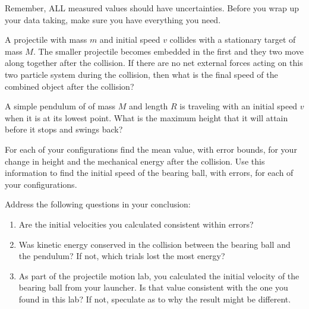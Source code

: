 \selfcheck

Remember, ALL measured values should have uncertainties. Before you wrap up your data taking, make sure you have everything you need.

\prelab

\prelabquestion
A projectile with mass $m$ and initial speed $v$ collides with a stationary target of mass $M$. The smaller projectile becomes embedded in the first and they two move along together after the collision. If there are no net external forces acting on this two particle system during the collision, then what is the final speed of the combined object after the collision?

\prelabquestion
A simple pendulum of of mass $M$ and length $R$ is traveling with an initial speed $v$ when it is at its lowest point.  What is the maximum height that it will attain before it stops and swings back?

\analysis

For each of your configurations find the mean value, with error bounds, for your change in height and the mechanical energy after the collision. Use this information to find the initial speed of the bearing ball, with errors, for each of your configurations.

Address the following questions in your conclusion:
\begin{enumerate}
    \item Are the initial velocities you calculated consistent within errors?
    \item Was kinetic energy conserved in the collision between the bearing ball and the pendulum? If not, which trials lost the most energy?
    \item As part of the projectile motion lab, you calculated the initial velocity of the bearing ball from your launcher.  Is that value consistent with the one you found in this lab? If not, speculate as to why the result might be different.
\end{enumerate}
